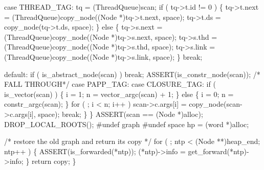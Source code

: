         case THREAD_TAG:
            tq = (ThreadQueue)scan;
            if ( tq->t.id != 0 )
            \{
                tq->t.next = (ThreadQueue)copy_node((Node *)tq->t.next, space);
                tq->t.ds   = copy_node(tq->t.ds, space);
            \}
            else
            \{
                tq->s.next = (ThreadQueue)copy_node((Node *)tq->s.next, space);
                tq->s.thd  = (ThreadQueue)copy_node((Node *)tq->s.thd, space);
                tq->s.link = (ThreadQueue)copy_node((Node *)tq->s.link, space);
            \}
            break;

        default:
            if ( is_abstract_node(scan) )
                break;
            ASSERT(is_constr_node(scan));
            /* FALL THROUGH*/
        case PAPP_TAG:
        case CLOSURE_TAG:
            if ( is_vector(scan) )
            \{
                i = 1;
                n = vector_argc(scan) + 1;
            \}
            else
            \{
                i = 0;
                n = constr_argc(scan);
            \}
            for ( ; i < n; i++ )
                scan->c.args[i] = copy_node(scan->c.args[i], space);
            break;
        \}
    \}
    ASSERT(scan == (Node *)alloc);
    DROP_LOCAL_ROOTS();
#undef graph
#undef space
    hp = (word *)alloc;

    /* restore the old graph and return its copy */
    for ( ; ntp < (Node **)heap_end; ntp++ )
    \{
        ASSERT(is_forwarded(*ntp));
        (*ntp)->info = get_forward(*ntp)->info;
    \}
    return copy;
\}
\nwendcode{}

%
%

